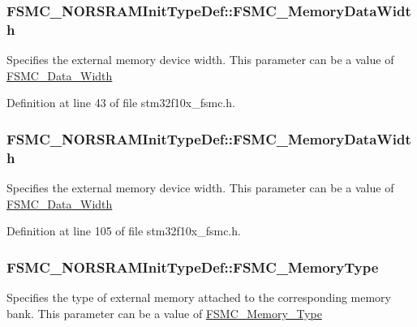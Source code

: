 \subsubsection[{\texorpdfstring{F\+S\+M\+C\+\_\+\+Memory\+Data\+Width}{FSMC_MemoryDataWidth}}]{ F\+S\+M\+C\+\_\+\+N\+O\+R\+S\+R\+A\+M\+Init\+Type\+Def\+::\+F\+S\+M\+C\+\_\+\+Memory\+Data\+Width}\hypertarget{struct_f_s_m_c___n_o_r_s_r_a_m_init_type_def_a9cd77c29d6dcfc2da434e557ef38a920}{}\label{struct_f_s_m_c___n_o_r_s_r_a_m_init_type_def_a9cd77c29d6dcfc2da434e557ef38a920}
Specifies the external memory device width. This parameter can be a value of \hyperlink{group___f_s_m_c___data___width}{F\+S\+M\+C\+\_\+\+Data\+\_\+\+Width} 

Definition at line 43 of file stm32f10x\+\_\+fsmc.\+h.

\subsubsection[{\texorpdfstring{F\+S\+M\+C\+\_\+\+Memory\+Data\+Width}{FSMC_MemoryDataWidth}}]{ F\+S\+M\+C\+\_\+\+N\+O\+R\+S\+R\+A\+M\+Init\+Type\+Def\+::\+F\+S\+M\+C\+\_\+\+Memory\+Data\+Width}\hypertarget{struct_f_s_m_c___n_o_r_s_r_a_m_init_type_def_a1791c771ff86f5dc5422040409517e9d}{}\label{struct_f_s_m_c___n_o_r_s_r_a_m_init_type_def_a1791c771ff86f5dc5422040409517e9d}
Specifies the external memory device width. This parameter can be a value of \hyperlink{group___f_s_m_c___data___width}{F\+S\+M\+C\+\_\+\+Data\+\_\+\+Width} 

Definition at line 105 of file stm32f10x\+\_\+fsmc.\+h.

\subsubsection[{\texorpdfstring{F\+S\+M\+C\+\_\+\+Memory\+Type}{FSMC_MemoryType}}]{ F\+S\+M\+C\+\_\+\+N\+O\+R\+S\+R\+A\+M\+Init\+Type\+Def\+::\+F\+S\+M\+C\+\_\+\+Memory\+Type}\hypertarget{struct_f_s_m_c___n_o_r_s_r_a_m_init_type_def_aadbf8bf431e05297c529213e9d6556a7}{}\label{struct_f_s_m_c___n_o_r_s_r_a_m_init_type_def_aadbf8bf431e05297c529213e9d6556a7}
Specifies the type of external memory attached to the corresponding memory bank. This parameter can be a value of \hyperlink{group___f_s_m_c___memory___type}{F\+S\+M\+C\+\_\+\+Memory\+\_\+\+Type} 


